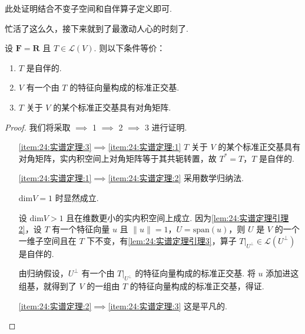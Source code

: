 此处证明结合不变子空间和自伴算子定义即可.

忙活了这么久，接下来就到了最激动人心的时刻了.

\begin{theorem}
    设 $ \mathbf{F} = \mathbf{R} $ 且 $ T \in \mathcal{L}(V) $. 则以下条件等价：
    \begin{enumerate}
        \item \label{item:24:实谱定理:1}
              $ T $ 是自伴的.

        \item \label{item:24:实谱定理:2}
              $ V $ 有一个由 $ T $ 的特征向量构成的标准正交基.

        \item \label{item:24:实谱定理:3}
              $ T $ 关于 $ V $ 的某个标准正交基具有对角矩阵.
    \end{enumerate}
\end{theorem}

\begin{proof}
    我们将采取 $\implies$ 1 $\implies$ 2 $\implies$ 3 进行证明.

    \begin{itemize}[leftmargin=.8in] %
        \item[\ref*{item:24:实谱定理:3}$\implies$\ref*{item:24:实谱定理:1}] $ T $ 关于 $ V $ 的某个标准正交基具有对角矩阵，实内积空间上对角矩阵等于其共轭转置，故 $ T^* = T $，$ T $ 是自伴的.

        \item[\ref*{item:24:实谱定理:1}$\implies$\ref*{item:24:实谱定理:2}] 采用数学归纳法.

            $ \mathrm{dim}V = 1 $ 时显然成立.

            设 $ \mathrm{dim}V > 1 $ 且在维数更小的实内积空间上成立. 因为\autoref{lem:24:实谱定理引理2}，设 $ T $ 有一个特征向量 $ u $ 且 $ \lVert u \rVert = 1 $，$ U = \mathrm{span}(u) $，则 $ U $ 是 $ V $ 的一个一维子空间且在 $ T $ 下不变，有\autoref{lem:24:实谱定理引理3}，算子 $ T|_{U^{\perp }} \in \mathcal{L}(U^{\perp }) $ 是自伴的.

            由归纳假设，$ U^{\perp } $ 有一个由 $ T|_{U^{\perp }} $ 的特征向量构成的标准正交基. 将 $ u $ 添加进这组基，就得到了 $ V $ 的一组由 $ T $ 的特征向量构成的标准正交基，得证.

        \item[\ref*{item:24:实谱定理:2}$\implies$\ref*{item:24:实谱定理:3}] 这是平凡的.
    \end{itemize}
\end{proof}

